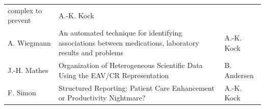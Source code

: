 \documentclass[
12pt,
headsepline,
bibliography=totoc,
twoside=semi,
fleqn
]{scrartcl}
\begin{document}
\begin{table}[t]
\begin{tabular}{p{2.5cm}p{8.7cm}p{2.8cm}}
        complex to prevent & A.-K. Kock \\
        A. Wiegmann & An automated technique for identifying associations between medications,
        laboratory results and problems & A.-K. Kock \\
        J.-H. Mathes & Organization of Heterogeneous Scientific Data Using the EAV/CR
        Representation & B. Andersen\\
        F. Simon & Structured Reporting: Patient Care Enhancement or Productivity Nightmare? & A.-K. Kock\\
        \bottomrule
    \end{tabular}
    \vspace{2ex}
\end{table}


\newpage
%

\footnotesize
\end{document}
